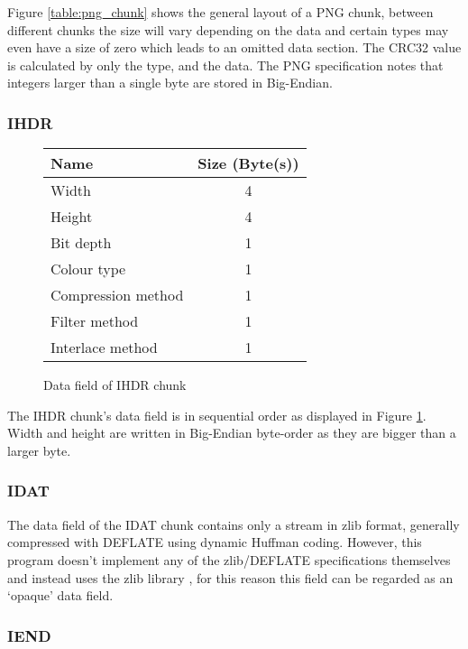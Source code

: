 \documentclass{report}
\begin{document}
Figure \ref{table:png_chunk} shows the general layout of a PNG chunk, between different chunks the size will vary depending on the data and certain types may even have a size of zero which leads to an omitted data section. The CRC32 value is calculated by only the type, and the data. The PNG specification notes that integers larger than a single byte are stored in Big-Endian.

\subsubsection{IHDR}

\begin{figure}[!htb]
\begin{center}
  \begin{tabular}{| l | c |}
   \hline
   Name & Size (Byte(s)) \\
   \hline
   Width               & 4 \\
   Height              & 4 \\
   Bit depth           & 1 \\
   Colour type         & 1 \\
   Compression method  & 1 \\
   Filter method       & 1 \\
   Interlace method    & 1 \\
   \hline
  \end{tabular}
\end{center}
\caption{Data field of IHDR chunk}
\label{table:ihdr}
\end{figure}

The IHDR chunk's data field is in sequential order as displayed in Figure \ref{table:ihdr}. Width and height are written in Big-Endian byte-order as they are bigger than a larger byte.

\subsubsection{IDAT}

The data field of the IDAT chunk contains only a stream in zlib format\cite{zlib}, generally compressed with DEFLATE using dynamic Huffman coding. However, this program doesn't implement any of the zlib/DEFLATE specifications themselves and instead uses the zlib library \cite{libzlib}, for this reason this field can be regarded as an `opaque' data field.

\subsubsection{IEND}
\end{document}
